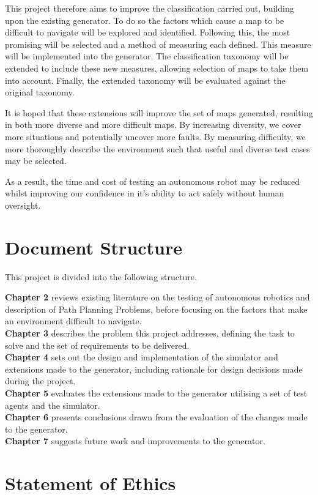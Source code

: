 \documentclass[authoryearcitations]{UoYCSproject}
\begin{document}
This project therefore aims to improve the classification carried out, building upon the existing generator. To do so the factors which cause a map to be difficult to navigate will be explored and identified. Following this, the most promising will be selected and a method of measuring each defined. This measure will be implemented into the generator. The classification taxonomy will be extended to include these new measures, allowing selection of maps to take them into account. Finally, the extended taxonomy will be evaluated against the original taxonomy.

It is hoped that these extensions will improve the set of maps generated, resulting in both more diverse and more difficult maps. By increasing diversity, we cover more situations and potentially uncover more faults. By measuring difficulty, we more thoroughly describe the environment such that useful and diverse test cases may be selected.

As a result, the time and cost of testing an autonomous robot may be reduced whilst improving our confidence in it's ability to act safely without human oversight.

\section{Document Structure}
\label{sec:DocStruct}
This project is divided into the following structure.

\textbf{Chapter 2} reviews existing literature on the testing of autonomous robotics and description of Path Planning Problems, before focusing on the factors that make an environment difficult to navigate.\\
\textbf{Chapter 3} describes the problem this project addresses, defining the task to solve and the set of requirements to be delivered.\\
\textbf{Chapter 4} sets out the design and implementation of the simulator and extensions made to the generator, including rationale for design decisions made during the project.\\
\textbf{Chapter 5} evaluates the extensions made to the generator utilising a set of test agents and the simulator.\\
\textbf{Chapter 6} presents conclusions drawn from the evaluation of the changes made to the generator.\\
\textbf{Chapter 7} suggests future work and improvements to the generator.

\section{Statement of Ethics}
\label{sec:Ethics}
\end{document}
